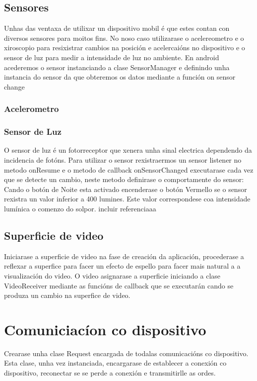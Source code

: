 \subsection{Sensores}
Unhas das ventaxa de utilixar un dispositivo mobil é que estes contan con diversos sensores para moitos fins. No noso caso utilizarase o acelereometro e o xiroscopio para resixistrar cambios na posición e acelercaións no dispositivo e o sensor de luz para medir a intensidade de luz no ambiente.
En android acederemos o sensor instanciando a clase SensorManager e definindo unha instancia do sensor da que obteremos os datos mediante a función on sensor change
\subsubsection{Acelerometro}
\subsubsection{Sensor de Luz}
O sensor de luz é un fotorreceptor que xenera unha sinal electrica dependendo da incidencia de fotóns. Para utilizar o sensor rexistraermos un sensor listener no metodo onResume e o metodo de callback onSensorChanged executarase cada vez que se detecte un cambio, neste metodo definirase o comportamente do sensor: Cando o botón de Noite esta activado encenderase o botón Vermello se o sensor rexistra un valor inferior a 400 lumines. Este valor correspondese coa intensidade lumínica o comenzo do solpor.
incluir referenciaaa

\subsection{Superficie de video}
Iniciarase a superficie de video na fase de creación da aplicación, procederase a reflexar a superfice para facer un efecto de espello para facer mais natural a a visualización do video. O video asignarase a superficie iniciando a clase VideoReceiver mediante as funcións de callback que se executarán cando se produza un cambio na superfice de video.

\section{Comuniciacíon co dispositivo}
Crearase unha clase Request encargada de todalas comunicacións co dispositivo.  Esta clase, unha vez instanciada, encargarase de establecer a conexión co dispositivo, reconectar se se perde a conexión e transmitirlle as ordes.

